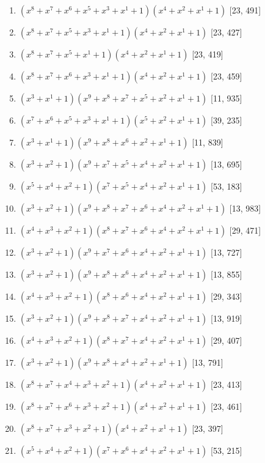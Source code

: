 \documentclass[10pt,twocolumn]{article}
\begin{document}
\begin{enumerate}
\item $(x^{8} + x^{7} + x^{6} + x^{5} + x^{3} + x^{1} + 1)(x^{4} + x^{2} + x^{1} + 1)$  [23, 491]
\item $(x^{8} + x^{7} + x^{5} + x^{3} + x^{1} + 1)(x^{4} + x^{2} + x^{1} + 1)$  [23, 427]
\item $(x^{8} + x^{7} + x^{5} + x^{1} + 1)(x^{4} + x^{2} + x^{1} + 1)$  [23, 419]
\item $(x^{8} + x^{7} + x^{6} + x^{3} + x^{1} + 1)(x^{4} + x^{2} + x^{1} + 1)$  [23, 459]
\item $(x^{3} + x^{1} + 1)(x^{9} + x^{8} + x^{7} + x^{5} + x^{2} + x^{1} + 1)$  [11, 935]
\item $(x^{7} + x^{6} + x^{5} + x^{3} + x^{1} + 1)(x^{5} + x^{2} + x^{1} + 1)$  [39, 235]
\item $(x^{3} + x^{1} + 1)(x^{9} + x^{8} + x^{6} + x^{2} + x^{1} + 1)$  [11, 839]
\item $(x^{3} + x^{2} + 1)(x^{9} + x^{7} + x^{5} + x^{4} + x^{2} + x^{1} + 1)$  [13, 695]
\item $(x^{5} + x^{4} + x^{2} + 1)(x^{7} + x^{5} + x^{4} + x^{2} + x^{1} + 1)$  [53, 183]
\item $(x^{3} + x^{2} + 1)(x^{9} + x^{8} + x^{7} + x^{6} + x^{4} + x^{2} + x^{1} + 1)$  [13, 983]
\item $(x^{4} + x^{3} + x^{2} + 1)(x^{8} + x^{7} + x^{6} + x^{4} + x^{2} + x^{1} + 1)$  [29, 471]
\item $(x^{3} + x^{2} + 1)(x^{9} + x^{7} + x^{6} + x^{4} + x^{2} + x^{1} + 1)$  [13, 727]
\item $(x^{3} + x^{2} + 1)(x^{9} + x^{8} + x^{6} + x^{4} + x^{2} + x^{1} + 1)$  [13, 855]
\item $(x^{4} + x^{3} + x^{2} + 1)(x^{8} + x^{6} + x^{4} + x^{2} + x^{1} + 1)$  [29, 343]
\item $(x^{3} + x^{2} + 1)(x^{9} + x^{8} + x^{7} + x^{4} + x^{2} + x^{1} + 1)$  [13, 919]
\item $(x^{4} + x^{3} + x^{2} + 1)(x^{8} + x^{7} + x^{4} + x^{2} + x^{1} + 1)$  [29, 407]
\item $(x^{3} + x^{2} + 1)(x^{9} + x^{8} + x^{4} + x^{2} + x^{1} + 1)$  [13, 791]
\item $(x^{8} + x^{7} + x^{4} + x^{3} + x^{2} + 1)(x^{4} + x^{2} + x^{1} + 1)$  [23, 413]
\item $(x^{8} + x^{7} + x^{6} + x^{3} + x^{2} + 1)(x^{4} + x^{2} + x^{1} + 1)$  [23, 461]
\item $(x^{8} + x^{7} + x^{3} + x^{2} + 1)(x^{4} + x^{2} + x^{1} + 1)$  [23, 397]
\item $(x^{5} + x^{4} + x^{2} + 1)(x^{7} + x^{6} + x^{4} + x^{2} + x^{1} + 1)$  [53, 215]

\end{enumerate}
\end{document}
